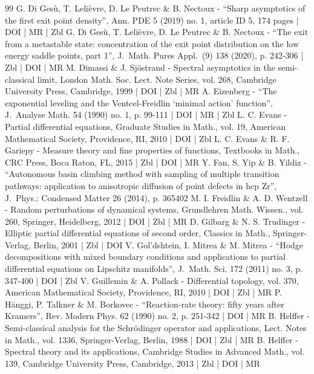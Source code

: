 \documentclass[10pt]{amsart}
\theoremstyle{plain}
\theoremstyle{definition}
\begin{document}
\begin{thebibliography}{99}
G. Di Gesù, T. Lelièvre, D. Le Peutrec \& B. Nectoux - “Sharp asymptotics of the first exit point density”, Ann. PDE 5 (2019) no. 1, article ID 5, 174 pages | DOI | MR | Zbl
G. Di Gesù, T. Lelièvre, D. Le Peutrec \& B. Nectoux - “The exit from a metastable state: concentration of the exit point distribution on the low energy saddle points, part 1”, J. Math. Pures Appl. (9) 138 (2020), p. 242-306 | Zbl | DOI | MR
M. Dimassi \& J. Sjöstrand - Spectral asymptotics in the semi-classical limit, London Math. Soc. Lect. Note Series, vol. 268, Cambridge University Press, Cambridge, 1999 | DOI | Zbl | MR
A. Eizenberg - “The exponential leveling and the Ventcel-Freidlin ‘minimal action’ function”, J. Analyse Math. 54 (1990) no. 1, p. 99-111 | DOI | MR | Zbl
L. C. Evans - Partial differential equations, Graduate Studies in Math., vol. 19, American Mathematical Society, Providence, RI, 2010 | DOI | Zbl
L. C. Evans \& R. F. Gariepy - Measure theory and fine properties of functions, Textbooks in Math., CRC Press, Boca Raton, FL, 2015 | Zbl | DOI | MR
Y. Fan, S. Yip \& B. Yildiz - “Autonomous basin climbing method with sampling of multiple transition pathways: application to anisotropic diffusion of point defects in hcp Zr”, J. Phys.: Condensed Matter 26 (2014), p. 365402
M. I. Freidlin \& A. D. Wentzell - Random perturbations of dynamical systems, Grundlehren Math. Wissen., vol. 260, Springer, Heidelberg, 2012 | DOI | Zbl | MR
D. Gilbarg \& N. S. Trudinger - Elliptic partial differential equations of second order, Classics in Math., Springer-Verlag, Berlin, 2001 | Zbl | DOI
V. Gol’dshtein, I. Mitrea \& M. Mitrea - “Hodge decompositions with mixed boundary conditions and applications to partial differential equations on Lipschitz manifolds”, J. Math. Sci. 172 (2011) no. 3, p. 347-400 | DOI | Zbl
V. Guillemin \& A. Pollack - Differential topology, vol. 370, American Mathematical Society, Providence, RI, 2010 | DOI | Zbl | MR
P. Hänggi, P. Talkner \& M. Borkovec - “Reaction-rate theory: fifty years after Kramers”, Rev. Modern Phys. 62 (1990) no. 2, p. 251-342 | DOI | MR
B. Helffer - Semi-classical analysis for the Schrödinger operator and applications, Lect. Notes in Math., vol. 1336, Springer-Verlag, Berlin, 1988 | DOI | Zbl | MR
B. Helffer - Spectral theory and its applications, Cambridge Studies in Advanced Math., vol. 139, Cambridge University Press, Cambridge, 2013 | Zbl | DOI | MR

\end{thebibliography}
\end{document}
